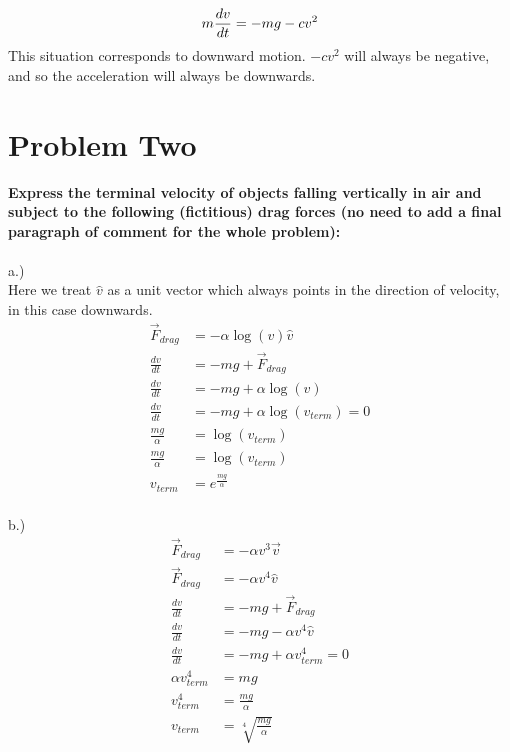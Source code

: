 \documentclass[10pt]{article} %
\begin{document}
\begin{equation}
  m\frac{dv}{dt} = -mg - cv^2\\
\end{equation}
This situation corresponds to downward motion. $-cv^2$ will always be negative, and so the acceleration will always be downwards.\\

\vspace{1 cm}

\section{Problem Two}
\textbf{Express  the  terminal  velocity  of  objects  falling  vertically  in  air  and  subject to the following (fictitious) drag  forces (no need to add a  final paragraph of comment  for the whole problem):} \\ \\

a.)\\
Here we treat $\hat{v}$ as a unit vector which always points in the direction of velocity, in this case downwards.\\

\begin{align}
  \vec{F}_{drag} &= -\alpha\log(v)\hat{v}\\
  \frac{dv}{dt} &= -mg + \vec{F}_{drag}\\
  \frac{dv}{dt} &= -mg + \alpha\log(v)\\  
  \frac{dv}{dt} &= -mg + \alpha\log(v_{term}) = 0\\
  \frac{mg}{\alpha} &= \log(v_{term})\\
  \frac{mg}{\alpha} &= \log(v_{term})\\
  v_{term} &= e^{\frac{mg}{\alpha}}\\
\end{align}

b.)
\begin{align}
  \vec{F}_{drag} &= -\alpha v^3\vec{v}\\
  \vec{F}_{drag} &= -\alpha v^4\hat{v}\\  
  \frac{dv}{dt} &= -mg + \vec{F}_{drag}\\
  \frac{dv}{dt} &= -mg -\alpha v^4\hat{v}\\
  \frac{dv}{dt} &= -mg +\alpha v_{term}^4 = 0\\
  \alpha v_{term}^4 &= mg\\
  v_{term}^4 &= \frac{mg}{\alpha}\\
  v_{term} &= \sqrt[4]{\frac{mg}{\alpha}}\\
 \end{align}
\end{document}
